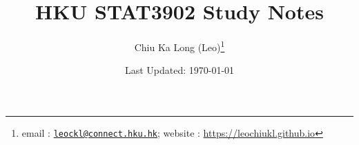 \documentclass{article}
\begin{document}
\title{HKU STAT3902 Study Notes}
\author{Chiu Ka Long (Leo)\thanks{email :
\href{mailto:leockl@connect.hku.hk}{\texttt{leockl@connect.hku.hk}};
website :
\url{https://leochiukl.github.io}
}}
\date{Last Updated: \today}
\maketitle
\doclicenseThis
\nocite{*}
\tableofcontents


\printbibliography

\end{document}
